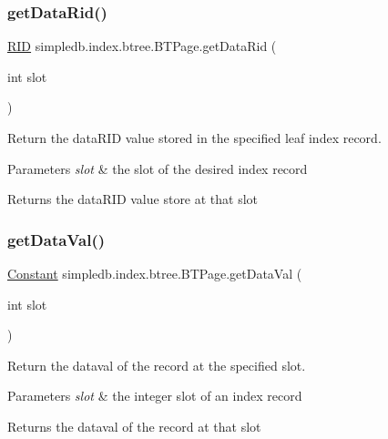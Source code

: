 \subsubsection{\texorpdfstring{get\+Data\+Rid()}{getDataRid()}}
{\footnotesize\ttfamily \hyperlink{classsimpledb_1_1record_1_1RID}{R\+ID} simpledb.\+index.\+btree.\+B\+T\+Page.\+get\+Data\+Rid (\begin{DoxyParamCaption}\item[{int}]{slot }\end{DoxyParamCaption})\hspace{0.3cm}{\ttfamily [inline]}}

Return the data\+R\+ID value stored in the specified leaf index record. 
\begin{DoxyParams}{Parameters}
{\em slot} & the slot of the desired index record \\
\hline
\end{DoxyParams}
\begin{DoxyReturn}{Returns}
the data\+R\+ID value store at that slot 
\end{DoxyReturn}
\mbox{\label{classsimpledb_1_1index_1_1btree_1_1BTPage_a1e192bef2519022c3b29aae2d6162861}} 
\subsubsection{\texorpdfstring{get\+Data\+Val()}{getDataVal()}}
{\footnotesize\ttfamily \hyperlink{classsimpledb_1_1query_1_1Constant}{Constant} simpledb.\+index.\+btree.\+B\+T\+Page.\+get\+Data\+Val (\begin{DoxyParamCaption}\item[{int}]{slot }\end{DoxyParamCaption})\hspace{0.3cm}{\ttfamily [inline]}}

Return the dataval of the record at the specified slot. 
\begin{DoxyParams}{Parameters}
{\em slot} & the integer slot of an index record \\
\hline
\end{DoxyParams}
\begin{DoxyReturn}{Returns}
the dataval of the record at that slot 
\end{DoxyReturn}
\mbox{\label{classsimpledb_1_1index_1_1btree_1_1BTPage_a85cda5670746c6d33e2e57fe482d2677}} 
